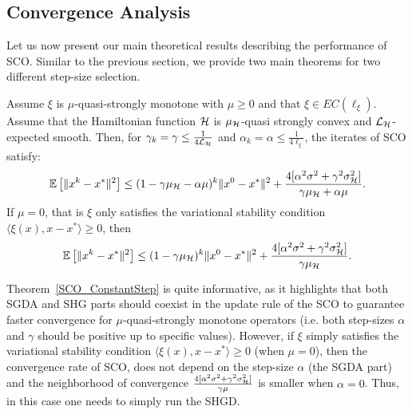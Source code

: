\documentclass{article}
\begin{document}
\subsection{Convergence Analysis}
Let us now present our main theoretical results describing the performance of SCO. Similar to the previous section, we provide two main theorems for two different step-size selection. 
\begin{theorem}
\label{SCO_ConstantStep}
Assume $\xi$ is $\mu$-quasi-strongly monotone with $\mu \geq 0$ and that $\xi \in EC( \ell_{\xi})$. 
Assume that the Hamiltonian function ${\cal H}$ is $\mu_{{\cal H}}$-quasi strongly convex and ${\cal L}_{{\cal H}}$-expected smooth. Then, for $\gamma_k=\gamma \leq \frac{1}{4{\cal L}_{{\cal H}}}$ and $\alpha_k=\alpha \leq  \frac{1}{4\ell_\xi}$, the iterates of SCO satisfy:
\vspace{-2mm}
\begin{eqnarray}
\mathbb{E}\left[ \|x^{k}-x^*\|^2 \right]\leq(1-\gamma\mu_{{\cal H}}  - \alpha\mu )^k\|x^0-x^*\|^2 + \frac{4[\alpha^2 \sigma^2 + \gamma^2  \sigma_{{\cal H}}^2]}{\gamma\mu_{{\cal H}}  +\alpha\mu}.
\end{eqnarray}
If $\mu=0$, that is $\xi$ only satisfies the variational stability condition $\langle\xi(x),x-x^*\rangle \geq0$, then 
$$\mathbb{E} \left[ \|x^{k}-x^*\|^2 \right]\leq (1-\gamma\mu_{{\cal H}} )^k \|x^0-x^*\|^2  + \frac{4 [\alpha^2 \sigma^2 +  \gamma^2  \sigma_{{\cal H}}^2]}{\gamma \mu_{{\cal H}} }.$$
\end{theorem}
Theorem~\ref{SCO_ConstantStep} is quite informative, as it highlights that both SGDA and SHG parts should coexist in the update rule of the SCO to guarantee faster convergence for $\mu$-quasi-strongly monotone operators (i.e. both step-sizes $\alpha$ and $\gamma$ should be positive up to specific values). However, if $\xi$ simply satisfies the variational stability condition $\langle\xi(x),x-x^*\rangle \geq0$ (when $\mu=0$), then the convergence rate of SCO, does not depend on the step-size $\alpha$ (the SGDA part) and the neighborhood of convergence $\frac{4 [\alpha^2 \sigma^2 +  \gamma^2  \sigma_{{\cal H}}^2]}{\gamma \mu }$ is smaller when $\alpha=0$. Thus, in this case one needs to simply run the SHGD.
\end{document}
